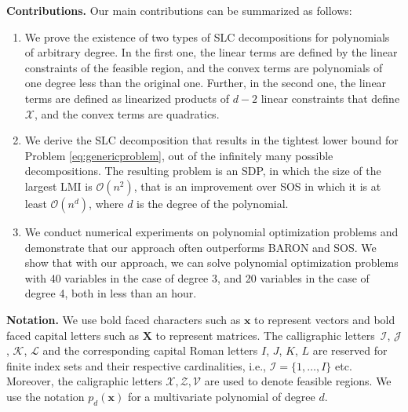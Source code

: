 \documentclass[opre,nonblindrev]{informs3} %
\begin{document}
\medskip\noindent 
{\bf Contributions.}
Our main contributions can be summarized as follows: 
\begin{enumerate} 
\item We prove the existence of two types of SLC decompositions for polynomials of arbitrary degree. In the first one, the linear terms are defined by the linear constraints of the feasible region, and the convex terms are polynomials of one degree less than the original one. {\color{black} Further, in the second one, the linear terms are defined as linearized products of $d-2$ linear constraints that define $\mathcal{X}$, and the convex terms are quadratics.} 
\item We derive the SLC decomposition that results in the tightest lower bound for Problem \eqref{eq:genericproblem}, out of the infinitely many possible decompositions. The resulting problem is an SDP, in which the size of the largest LMI is $\mathcal{O}(n^2)$, that is an improvement over SOS in which it is at least $\mathcal{O}(n^d)$, where $d$ is the degree of the polynomial. 
\item We conduct numerical experiments on polynomial optimization problems and demonstrate that our approach often outperforms BARON and SOS. We show that with our approach, we can solve polynomial optimization problems with 40 variables in the case of degree 3, and 20 variables in the case of degree 4, both in less than an hour. 
\end{enumerate}   

\vspace{0.3cm}

\medskip\noindent
{\bf Notation.} 
We use bold faced characters such as $ \boldsymbol{x} $ to represent vectors and bold faced capital letters such as $ \boldsymbol{X} $ to represent matrices. The calligraphic letters~$\mathcal{I}$, $\mathcal{J}$, $\mathcal{K}$, $\mathcal{L}$ and the corresponding capital Roman letters $I$, $J$, $K$, $L$ are reserved for finite index sets and their respective cardinalities, i.e., $\mathcal{I}= \{1,\dots, I\}$ etc. Moreover, the caligraphic letters $\mathcal{X}, \mathcal{Z},\mathcal{V}$ are used to denote feasible regions. We use the notation $p_d(\boldsymbol{x})$ for a multivariate polynomial of degree $d$.
\end{document}
